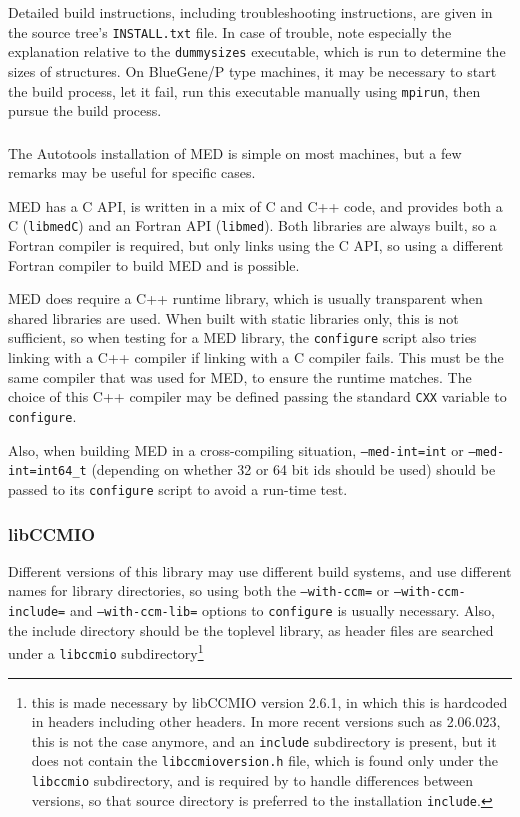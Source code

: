 \documentclass[a4paper,10pt,twoside]{csshortdoc}
\begin{document}
Detailed build instructions, including troubleshooting instructions,
are given in the source tree's \texttt{INSTALL.txt} file.
In case of trouble, note especially the explanation relative to the
\texttt{dummysizes} executable, which is run to determine the
sizes of structures. On BlueGene/P type machines, it may be necessary
to start the build process, let it fail, run this executable
manually using \texttt{mpirun}, then pursue the build process.

\subsubsection{\med\label{sec:ext:med}}

The Autotools installation of MED is simple on most machines,
but a few remarks may be useful for specific cases.

MED has a C API, is written in a mix of C and C++ code,
and provides both a C (\texttt{libmedC}) and an Fortran API
(\texttt{libmed}). Both libraries are always built, so a Fortran
compiler is required, but \CS only links using the C API, so using
a different Fortran compiler to build MED and \CS is possible.

MED does require a C++ runtime library, which is usually transparent
when shared libraries are used. When built with static libraries
only, this is not sufficient, so when testing for a MED library,
the \CS \texttt{configure} script also tries linking with a C++
compiler if linking with a C compiler fails. This must be the
same compiler that was used for MED, to ensure the runtime matches.
The choice of this C++ compiler may be defined passing the
standard \texttt{CXX} variable to \texttt{configure}.

Also, when building MED in a cross-compiling situation,
\texttt{--med-int=int} or \texttt{--med-int=int64\_t} (depending
on whether 32 or 64 bit ids should be used) should be
passed to its \texttt{configure} script to avoid a run-time
test.

\subsubsection{libCCMIO\label{sec:ext:libccmio}}

Different versions of this library may use different build
systems, and use different names for library directories,
so using both the \texttt{--with-ccm=} or \texttt{--with-ccm-include=}
and \texttt{--with-ccm-lib=} options to \texttt{configure} is
usually necessary.
Also, the include directory should be the toplevel library,
as header files are searched under a \texttt{libccmio}
subdirectory\footnote{this is made necessary by libCCMIO version
2.6.1, in which this is hardcoded in headers including other
headers. In more recent versions such as 2.06.023, this is not the
case anymore, and an \texttt{include} subdirectory is present, but
it does not contain the \texttt{libccmioversion.h} file, which is
found only under the \texttt{libccmio} subdirectory, and is required
by \CS to handle differences between versions, so that source
directory is preferred to the installation \texttt{include}.}
\end{document}
